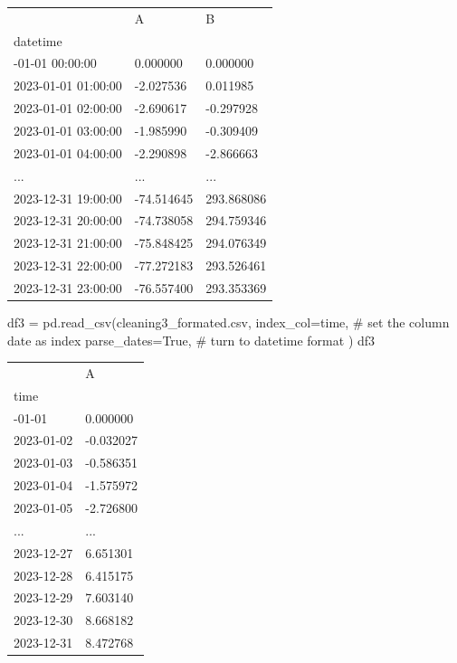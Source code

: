 \documentclass[
  letterpaper,
  DIV=11,
  numbers=noendperiod,
  oneside]{scrreprt}
\newenvironment{Shaded}{\begin{snugshade}}{\end{snugshade}}
\newcommand{\CommentTok}[1]{\textcolor[rgb]{0.37,0.37,0.37}{#1}}
\newcommand{\NormalTok}[1]{\textcolor[rgb]{0.00,0.23,0.31}{#1}}
\newcommand{\OperatorTok}[1]{\textcolor[rgb]{0.37,0.37,0.37}{#1}}
\newcommand{\StringTok}[1]{\textcolor[rgb]{0.13,0.47,0.30}{#1}}
\newcommand{\VariableTok}[1]{\textcolor[rgb]{0.07,0.07,0.07}{#1}}
\begin{document}
\begin{longtable}[]{@{}lll@{}}
\toprule\noalign{}
& A & B \\
datetime & & \\
\midrule\noalign{}
\endhead
\bottomrule\noalign{}
\endlastfoot
2023-01-01 00:00:00 & 0.000000 & 0.000000 \\
2023-01-01 01:00:00 & -2.027536 & 0.011985 \\
2023-01-01 02:00:00 & -2.690617 & -0.297928 \\
2023-01-01 03:00:00 & -1.985990 & -0.309409 \\
2023-01-01 04:00:00 & -2.290898 & -2.866663 \\
... & ... & ... \\
2023-12-31 19:00:00 & -74.514645 & 293.868086 \\
2023-12-31 20:00:00 & -74.738058 & 294.759346 \\
2023-12-31 21:00:00 & -75.848425 & 294.076349 \\
2023-12-31 22:00:00 & -77.272183 & 293.526461 \\
2023-12-31 23:00:00 & -76.557400 & 293.353369 \\
\end{longtable}

\begin{Shaded}
\begin{Highlighting}[]
\NormalTok{df3 }\OperatorTok{=}\NormalTok{ pd.read\_csv(}\StringTok{\textquotesingle{}cleaning3\_formated.csv\textquotesingle{}}\NormalTok{, }
\NormalTok{                  index\_col}\OperatorTok{=}\StringTok{\textquotesingle{}time\textquotesingle{}}\NormalTok{,     }\CommentTok{\# set the column date as index }
\NormalTok{                  parse\_dates}\OperatorTok{=}\VariableTok{True}\NormalTok{,     }\CommentTok{\# turn to datetime format}
\NormalTok{                )}
\NormalTok{df3}
\end{Highlighting}
\end{Shaded}

\begin{longtable}[]{@{}ll@{}}
\toprule\noalign{}
& A \\
time & \\
\midrule\noalign{}
\endhead
\bottomrule\noalign{}
\endlastfoot
2023-01-01 & 0.000000 \\
2023-01-02 & -0.032027 \\
2023-01-03 & -0.586351 \\
2023-01-04 & -1.575972 \\
2023-01-05 & -2.726800 \\
... & ... \\
2023-12-27 & 6.651301 \\
2023-12-28 & 6.415175 \\
2023-12-29 & 7.603140 \\
2023-12-30 & 8.668182 \\
2023-12-31 & 8.472768 \\
\end{longtable}
\end{document}
